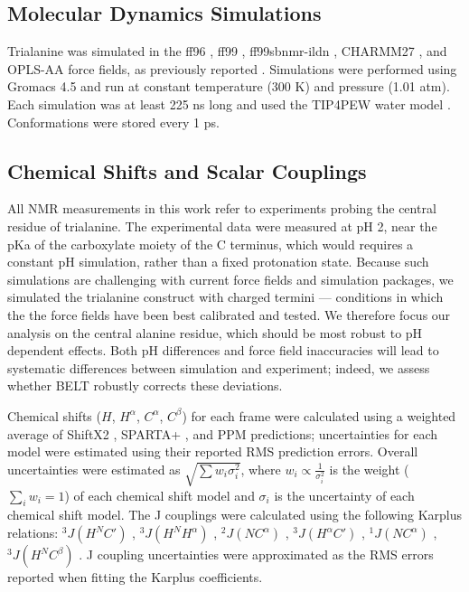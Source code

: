 \documentclass[journal=jacsat,manuscript=article]{achemso}
\begin{document}
\subsection*{Molecular Dynamics Simulations}

Trialanine was simulated in the ff96 \cite{kollman1996}, ff99 \cite{wang2000}, ff99sbnmr-ildn \cite{li2010, Lindorff-Larsen2010}, CHARMM27 \cite{mackerell2004extending,bjelkmar2010implementation}, and OPLS-AA \cite{kaminski2001evaluation} force fields, as previously reported  \cite{beauchamp2012protein}.  Simulations were performed using Gromacs 4.5  \cite{hess2008} and run at constant temperature (300 K) and pressure (1.01 atm).  Each simulation was at least 225 ns long and used the TIP4PEW water model \cite{horn2004}.  Conformations were stored every 1 ps.  

\subsection*{Chemical Shifts and Scalar Couplings}

All NMR measurements in this work refer to experiments probing the central residue of trialanine.\cite{Graf2007}  The experimental data were measured at pH 2, near the pKa of the carboxylate moiety of the C terminus, which would requires a constant pH simulation, rather than a fixed protonation state.  Because such simulations are challenging with current force fields and simulation packages, we simulated the trialanine construct with charged termini --- conditions in which the the force fields have been best calibrated and tested.  We therefore focus our analysis on the central alanine residue, which should be most robust to pH dependent effects.  Both pH differences and force field inaccuracies will lead to systematic differences between simulation and experiment; indeed, we assess whether BELT robustly corrects these deviations.  

Chemical shifts ($H$, $H^\alpha$, $C^\alpha$, $C^\beta$) for each frame were calculated using a weighted average of ShiftX2 \cite{han2011shiftx2}, SPARTA+  \cite{Shen2010}, and PPM \cite{li2012ppm} predictions; uncertainties for each model were estimated using their reported RMS prediction errors.  Overall uncertainties were estimated as $\sqrt{\sum w_i \sigma_i^2}$, where $w_i \propto \frac{1}{\sigma_i^2}$ is the weight ($\sum_i w_i = 1$) of each chemical shift model and $\sigma_i$ is the uncertainty of each chemical shift model.  The J couplings were calculated using the following Karplus relations: $^3J(H^N C')$  \cite{vogeli2007limits}, $^3J(H^N H^\alpha)$  \cite{vogeli2007limits}, $^2J(N C^\alpha)$  \cite{Graf2007}, $^3J(H^\alpha C')$  \cite{Schmidt1999}, $^1J(N C^\alpha)$  \cite{Graf2007}, $^3J(H^N C^\beta)$  \cite{vogeli2007limits}.  J coupling uncertainties were approximated as the RMS errors reported when fitting the Karplus coefficients.  
\end{document}
